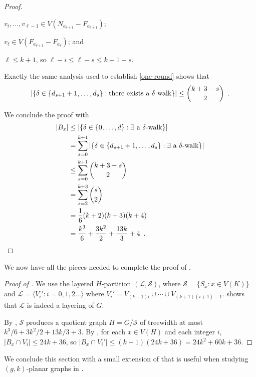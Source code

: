 \documentclass{patmorin}
\newcommand{\treewidth}{\ensuremath{k^3/6 + 3k^2/2 + 13k/3 + 3}}
\begin{document}
\begin{proof}
\begin{compactenum}[(i)]
    \item $v_i,\ldots,v_{\ell-1}\in V(N_{a_{\delta+1}}-F_{a_{\delta+1}})$;
    
    \item $v_\ell\in V(F_{a_{\delta+1}}-F_{a_\delta})$; and
    
    \item $\ell\le k+1$, so $\ell-i \le \ell-s \le k+1-s$.
  \end{compactenum}
  Exactly the same analysis used to establish \eqref{one-round} shows that
  \begin{equation}
     |\{\delta\in\{d_{s+1}+1,\ldots,d_s\}:  \mbox{there exists a $\delta$-walk} \}| \le \binom{k+3-s}{2} \enspace . \eqlabel{one-round-s}
  \end{equation}

  We conclude the proof with 
  \begin{align*}
    |B_x| & \le |\{\delta\in\{0,\ldots,d\}:  \mbox{$\exists$ a $\delta$-walk} \}| \\
      & = \sum_{s=0}^{k+1}|\{\delta\in\{d_{s+1}+1,\ldots,d_s\}:  \mbox{$\exists$ a $\delta$-walk} \}| \\
      & \le\sum_{s=0}^{k+1} \binom{k+3-s}{2} \\
      & = \sum_{s=2}^{k+3} \binom{s}{2} \\
      & = \frac{1}{6}(k+2)(k+3)(k+4) \\
      & = \frac{k^3}{6} + \frac{3k^2}{2} + \frac{13k}{3} + 4  \enspace . \qedhere
  \end{align*}
\end{proof}

We now have all the pieces needed to complete the proof of .

\begin{proof}[Proof of ]
  We use the layered $H$-partition $(\mathcal{L}, \mathcal{S})$, where $\mathcal{S}=\{S_x:x\in V(K)\}$ and $\mathcal{L}=\langle V_i': i=0,1,2\ldots\rangle$ where $V_i' = V_{(k+1)i}\cup\cdots\cup V_{(k+1)(i+1)-1}$.   shows that $\mathcal{L}$ is indeed a layering of $G$.

  By , $\mathcal{S}$ produces a quotient graph $H=G/\mathcal{S}$ of treewidth at most $\treewidth$.  By , for each $x\in V(H)$ and each integer $i$, $|B_x\cap V_i|\le 24k+36$, so $|B_x\cap V_i'|\le (k+1)(24k + 36) = 24k^2+60k+36$. 
\end{proof}

We conclude this section with a small extension of  that is useful when studying $(g,k)$-planar graphs in .
\end{document}

